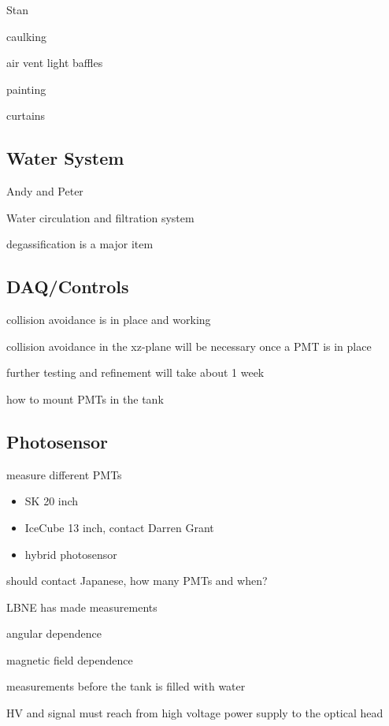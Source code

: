 Stan

caulking

air vent light baffles

painting

curtains


\subsection{Water System}
Andy and Peter

Water circulation and filtration system

degassification is a major item


\subsection{DAQ/Controls}
\label{}

collision avoidance is in place and working

collision avoidance in the xz-plane will be necessary once a PMT is in place

further testing and refinement will take about 1 week

how to mount PMTs in the tank


\subsection{Photosensor}

measure different PMTs
\begin{itemize}
\item SK 20 inch
\item IceCube 13 inch, contact Darren Grant
\item hybrid photosensor
\end{itemize}

should contact Japanese, how many PMTs and when?

LBNE has made measurements

angular dependence

magnetic field dependence


measurements before the tank is filled with water

HV and signal must reach from high voltage power supply to the optical
head

